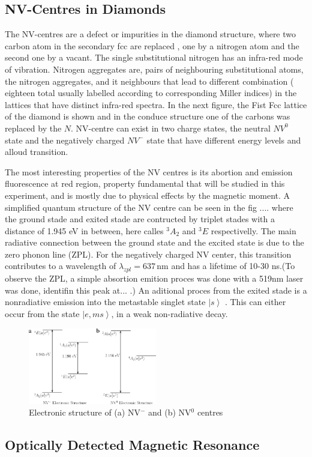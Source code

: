 \subsection{NV-Centres in Diamonds}
\label{sec:nvcentres}
 The NV-centres are a defect or impurities in the diamond structure, where two carbon atom in the secondary fcc are replaced , one by a nitrogen atom and the second one by a  vacant. The single substitutional nitrogen has an infra-red mode of vibration. Nitrogen aggregates are, pairs of neighbouring substitutional atoms, the nitrogen aggregates, and it neighbours that lead to different combination ( eighteen total usually labelled according to corresponding Miller indices) in the lattices that have distinct infra-red spectra. In the next figure, the Fist Fcc lattice of the diamond is shown and in the conduce structure one of the carbons was replaced by the $N$. NV-centre can exist in two charge states, the neutral $NV^{0}$ state and the negatively charged $NV^{-}$ state that have different energy levels and alloud transition.
 
The most interesting properties of the NV centres is its abortion and emission fluorescence at red region, property fundamental that will be studied in this experiment, and is mostly due to physical effects by the magnetic moment. A simplified quantum structure of the NV centre can be seen in the fig .... where the ground stade and exited stade are contructed by triplet stades with a distance of 1.945 eV in between, here calles $^{3}A_{2}$ and $^{3}E$  respectivelly. The main radiative connection between the ground state and the excited state is due to the zero phonon line (ZPL). For the negatively charged NV center, this transition contributes to a wavelength of $\lambda_{zpl} = 637\,\mathrm{nm}$ and has a lifetime of 10-30 ns.(To observe the ZPL, a simple absortion emition proces was done with a 519nm laser was done, identifin this peak at... .) 
An aditional proces from the exited stade is a nonradiative emission into the metastable singlet state $\left|s\right\rangle$ . This can either occur from the state $\left| e,ms\right\rangle$, in a weak non-radiative decay.

\begin{figure}
	\centering
	\includegraphics[width=0.5\textwidth]{../figures/nv-centre.png}
	\caption{Electronic structure of (a) NV$^-$ and (b) NV$^0$ centres \cite{doherty}}
	\label{fig:nvcentres}
\end{figure}


\subsection{Optically Detected Magnetic Resonance}








